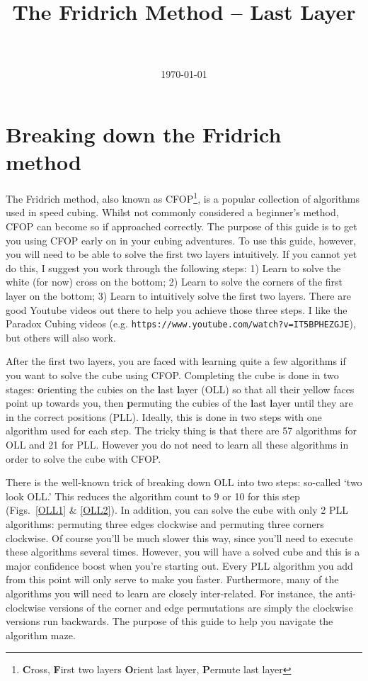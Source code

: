\documentclass[paper=a4, fontsize=11pt, parskip=full]{scrartcl} %
\title{	
\normalfont \normalsize 
\horrule{0.5pt} \\[0.4cm] %
\huge The Fridrich Method -- Last Layer \\ %
\horrule{2pt} \\[0.5cm] %
}
\date{\normalsize\today} %
\newcommand{\2}{\ensuremath{^2}} %
\begin{document}
\maketitle %




\section{Breaking down the Fridrich method}

The Fridrich method, also known as CFOP\footnote{\textbf{C}ross, \textbf{F}irst two layers
\textbf{O}rient last layer, \textbf{P}ermute last layer}, is a popular collection of 
algorithms used in speed cubing. Whilst not commonly considered a beginner's method,
CFOP can become so if approached correctly. The purpose of this guide is to get you using
CFOP early on in your cubing adventures. To use this guide, however, you will need to be 
able to solve the first two layers intuitively. If you cannot yet do this, I suggest you 
work through the following steps: 1) Learn to solve the white (for now) cross on the bottom; 
2) Learn to solve the corners of the first layer on the bottom; 3) Learn to intuitively solve 
the first two layers. 
There are good Youtube videos out there to help you achieve those three steps. I like the Paradox Cubing videos (e.g. \texttt{https://www.youtube.com/watch?v=IT5BPHEZGJE}), but others will also work.

After the first two layers, you are faced with learning quite a few algorithms if you want to 
solve the cube using CFOP. Completing the cube is done in two stages: \textbf{o}rienting the cubies on the 
\textbf{l}ast \textbf{l}ayer (OLL) so that all their yellow faces point up towards you, then 
\textbf{p}ermuting the cubies of the \textbf{l}ast \textbf{l}ayer until
they are in the correct positions (PLL). Ideally, this is done in two steps with one algorithm used for
each step. The tricky thing is that there are 57 algorithms for OLL and 21 
for PLL. However you do not need to learn all these algorithms in order to solve the cube with 
CFOP. 

There is the well-known trick of breaking down OLL into two steps: so-called `two look OLL.' 
This reduces the algorithm count to 9 or 10 for this step (Figs.~\ref{OLL1} \& \ref{OLL2}). 
In addition, you can solve the cube with only 2 PLL algorithms: permuting three edges clockwise and permuting three corners clockwise. 
Of course you'll be much slower this way, since you'll need to execute these algorithms several times. 
However, you will have a solved cube and this is a major confidence boost when you're starting out. 
Every PLL algorithm you add from this point will only serve to make you faster. Furthermore, many of 
the algorithms you will need to learn are closely inter-related. For instance, the anti-clockwise versions 
of the corner and edge permutations are simply the clockwise versions run backwards. The purpose
of this guide to help you navigate the algorithm maze.
\end{document}
